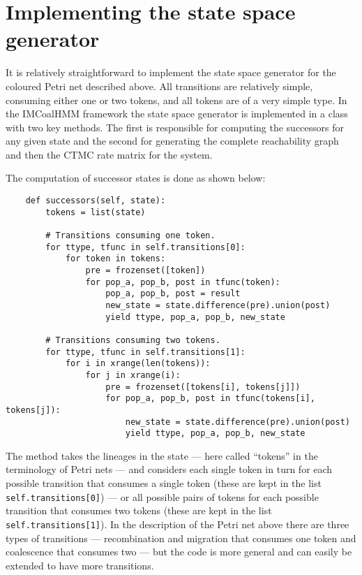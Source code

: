 \section{Implementing the state space generator}


It is relatively straightforward to implement the state space generator for the coloured Petri net described above. All transitions are relatively simple, consuming either one or two tokens, and all tokens are of a very simple type. In the IMCoalHMM framework the state space generator is implemented in a class with two key methods. The first is responsible for computing the successors for any given state and the second for generating the complete reachability graph and then the CTMC rate matrix for the system.

The computation of successor states is done as shown below:

\begin{lstlisting}
    def successors(self, state):
        tokens = list(state)

        # Transitions consuming one token.
        for ttype, tfunc in self.transitions[0]:
            for token in tokens:
                pre = frozenset([token])
                for pop_a, pop_b, post in tfunc(token):
                    pop_a, pop_b, post = result
                    new_state = state.difference(pre).union(post)
                    yield ttype, pop_a, pop_b, new_state

        # Transitions consuming two tokens.
        for ttype, tfunc in self.transitions[1]:
            for i in xrange(len(tokens)):
                for j in xrange(i):
                    pre = frozenset([tokens[i], tokens[j]])
                    for pop_a, pop_b, post in tfunc(tokens[i], tokens[j]):
                        new_state = state.difference(pre).union(post)
                        yield ttype, pop_a, pop_b, new_state
\end{lstlisting}

The method takes the lineages in the state --- here called ``tokens'' in the terminology of Petri nets --- and considers each single token in turn for each possible transition that consumes a single token (these are kept in the list \texttt{self.transitions[0]}) --- or all possible pairs of tokens for each possible transition that consumes two tokens (these are kept in the list \texttt{self.transitions[1]}). In the description of the Petri net above there are three types of transitions --- recombination and migration that consumes one token and coalescence that consumes two --- but the code is more general and can easily be extended to have more transitions.

